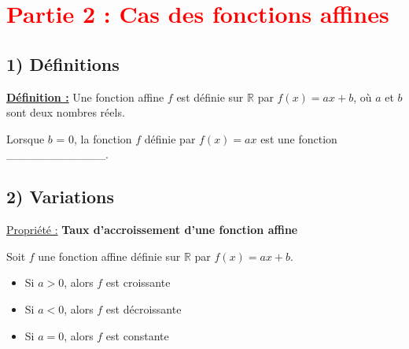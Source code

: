 \documentclass[12pt]{article}
\begin{document}
\section*{\textcolor{red}{Partie 2 : Cas des fonctions affines}}

\subsection*{\hspace{1cm} 1) Définitions}

\begin{mdframed}[
    linewidth=1pt,
    linecolor=ForestGreen,
    innertopmargin=10pt,
    innerbottommargin=10pt
]
{\color{ForestGreen}\textbf{\underline{Définition :}}}  
Une fonction affine $f$ est définie sur $\mathbb{R}$ par $f(x) = ax+b$, où $a$ et $b$ sont deux
nombres réels.

\vspace{5pt}
Lorsque $b$ = 0, la fonction $f$ définie par $f(x) = ax$ est une fonction \_\_\_\_\_\_\_\_\_\_\_\_.
\end{mdframed}

\subsection*{\hspace{1cm} 2) Variations}

\begin{mdframed}[
    linewidth=1pt,
    roundcorner=5pt,
    linecolor=Red,
    innertopmargin=10pt,
    innerbottommargin=10pt
]
{\color{red}
\underline{Propriété :} \textbf{Taux d'accroissement d'une fonction affine}

\vspace{5pt}
Soit $f$ une fonction affine définie sur $\mathbb{R}$ par $f(x) = ax+b$.
\begin{itemize}
    \item Si $a>0$, alors $f$ est croissante
    \item Si $a<0$, alors $f$ est décroissante
    \item Si $a=0$, alors $f$ est constante
\end{itemize}
}
\end{mdframed}
\end{document}
